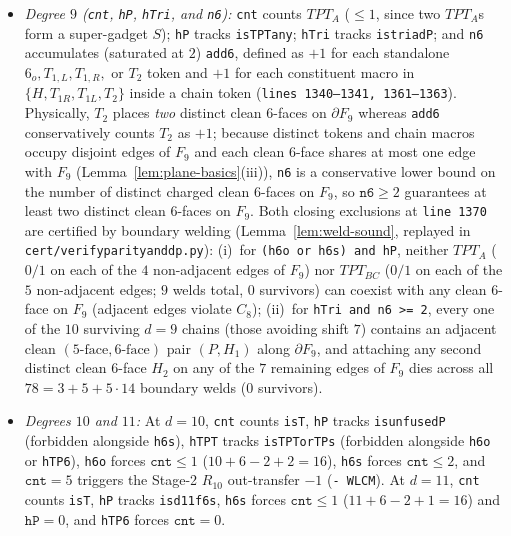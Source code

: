 \documentclass[11pt,reqno]{amsart}
\theoremstyle{plain}
\theoremstyle{definition}
\theoremstyle{remark}
\DeclareRobustCommand{\_}{\ifmmode\text{\textunderscore}\else\textunderscore\allowbreak\fi}
\begin{document}
\begin{enumerate}[label=(\alph*),leftmargin=2.2em]
\begin{itemize}[leftmargin=1.5em]
    \item \emph{Degree $9$ (\texttt{cnt}, \texttt{hP}, \texttt{hTri}, and \texttt{n6}):} \texttt{cnt} counts $TPT_A$ ($\le 1$, since two $TPT_A$s form a super-gadget $S$); \texttt{hP} tracks \texttt{is\_TPT\_any}; \texttt{hTri} tracks \texttt{is\_triadP}; and \texttt{n6} accumulates (saturated at $2$) \texttt{add6}, defined as $+1$ for each standalone $6_o, T_{1,L}, T_{1,R},$ or $T_2$ token and $+1$ for each constituent macro in $\{H, T_{1R}, T_{1L}, T_2\}$ inside a chain token (\texttt{lines 1340--1341, 1361--1363}). Physically, $T_2$ places \emph{two} distinct clean $6$-faces on $\partial F_9$ whereas \texttt{add6} conservatively counts $T_2$ as $+1$; because distinct tokens and chain macros occupy disjoint edges of $F_9$ and each clean $6$-face shares at most one edge with $F_9$ (Lemma~\ref{lem:plane-basics}(iii)), \texttt{n6} is a conservative lower bound on the number of distinct charged clean $6$-faces on $F_9$, so $\texttt{n6} \ge 2$ guarantees at least two distinct clean $6$-faces on $F_9$. Both closing exclusions at \texttt{line 1370} are certified by boundary welding (Lemma~\ref{lem:weld-sound}, replayed in \texttt{cert/verify\_parity\_and\_dp.py}): (i)~for \texttt{(h6o or h6s) and hP}, neither $TPT_A$ ($0/1$ on each of the $4$ non-adjacent edges of $F_9$) nor $TPT_{BC}$ ($0/1$ on each of the $5$ non-adjacent edges; $9$ welds total, $0$ survivors) can coexist with any clean $6$-face on $F_9$ (adjacent edges violate $C_8$); (ii)~for \texttt{hTri and n6 >= 2}, every one of the $10$ surviving $d = 9$ chains (those avoiding shift $7$) contains an adjacent clean $(5\text{-face}, 6\text{-face})$ pair $(P, H_1)$ along $\partial F_9$, and attaching any second distinct clean $6$-face $H_2$ on any of the $7$ remaining edges of $F_9$ dies across all $78 = 3 + 5 + 5 \cdot 14$ boundary welds ($0$ survivors).
    \item \emph{Degrees $10$ and $11$:} At $d = 10$, \texttt{cnt} counts \texttt{is\_T}, \texttt{hP} tracks \texttt{is\_unfusedP} (forbidden alongside \texttt{h6s}), \texttt{hTPT} tracks \texttt{is\_TPT\_or\_TPs} (forbidden alongside \texttt{h6o} or \texttt{hTP6}), \texttt{h6o} forces $\texttt{cnt} \le 1$ ($10+6-2+2=16$), \texttt{h6s} forces $\texttt{cnt} \le 2$, and $\texttt{cnt} = 5$ triggers the Stage-2 $R_{10}$ out-transfer $-1$ (\texttt{- W\_LCM}). At $d = 11$, \texttt{cnt} counts \texttt{is\_T}, \texttt{hP} tracks \texttt{is\_d11\_f6s}, \texttt{h6s} forces $\texttt{cnt} \le 1$ ($11+6-2+1=16$) and $\texttt{hP} = 0$, and \texttt{hTP6} forces $\texttt{cnt} = 0$.

\end{itemize}
\end{enumerate}
\end{document}
